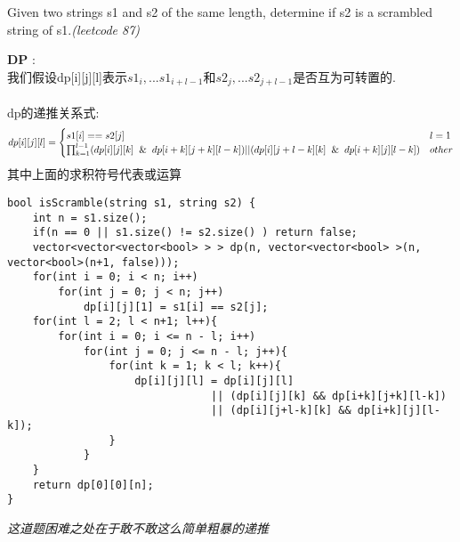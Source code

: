 \begin{description}
Given two strings s1 and s2 of the same length, determine if s2 is a scrambled string of s1.\textit{(leetcode 87)}
    \item{\textbf{DP}} : 
	\\我们假设dp[i][j][l]表示$s1_i, ... s1_{i+l-1}$和$s2_j, ... s2_{j+l-1}$是否互为可转置的.\\
	\\dp的递推关系式:
$$
dp[i][j][l] =
\begin{cases} 
s1[i] == s2[j] & l = 1 \\
\prod_{k=1}^{l-1}(dp[i][j][k] \And dp[i+k][j+k][l-k])||(dp[i][j+l-k][k] \And dp[i+k][j][l-k]) & other
\end{cases}
$$
其中上面的求积符号代表或运算
    \begin{lstlisting}
bool isScramble(string s1, string s2) {
	int n = s1.size();
	if(n == 0 || s1.size() != s2.size() ) return false;
	vector<vector<vector<bool> > > dp(n, vector<vector<bool> >(n, vector<bool>(n+1, false)));
	for(int i = 0; i < n; i++)
		for(int j = 0; j < n; j++)
			dp[i][j][1] = s1[i] == s2[j];
	for(int l = 2; l < n+1; l++){
		for(int i = 0; i <= n - l; i++)
			for(int j = 0; j <= n - l; j++){
				for(int k = 1; k < l; k++){
					dp[i][j][l] = dp[i][j][l] 
								|| (dp[i][j][k] && dp[i+k][j+k][l-k])
								|| (dp[i][j+l-k][k] && dp[i+k][j][l-k]);
				}
			}
	}
	return dp[0][0][n];
}
    \end{lstlisting}
	\textit{这道题困难之处在于敢不敢这么简单粗暴的递推}
\end{description}

